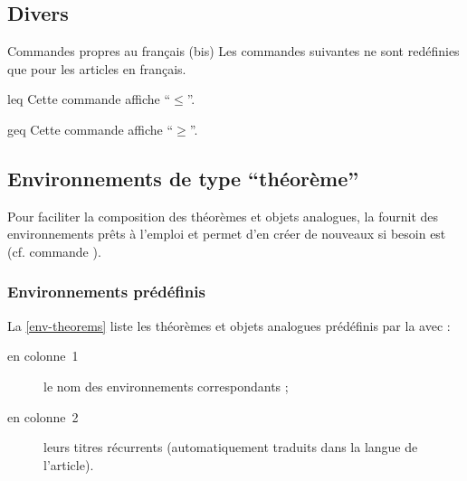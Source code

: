 \documentclass[english,nolocaltoc]{nwejmart}
\newtheorem[style=definition]{fait}
\newtheorem[title=expérience]{experience}
\newtheorem[title-plural=anneaux]{anneau}
\newtheorem[title=idéal,title-plural=idéaux]{ideal}
\begin{document}
\subsection{Divers}

\begin{dbremark}{Commandes propres au français (bis)}{}
  Les commandes suivantes ne sont redéfinies que pour les articles en
  français.
\end{dbremark}

\begin{docCommand}{leq}{}
  Cette commande affiche \enquote{$\leq$}.
\end{docCommand}
\begin{docCommand}{geq}{}
  Cette commande affiche \enquote{$\geq$}.
\end{docCommand}

\subsection{Environnements de type \enquote{théorème}}

Pour faciliter la composition des théorèmes et objets analogues, la
\nwejmauthorcl{} fournit des environnements prêts à l'emploi et permet d'en
créer de nouveaux si besoin est (cf. commande ).

\subsubsection{Environnements prédéfinis}
\label{sec:envir-de-type}

La \vref{env-theorems} liste les théorèmes et objets analogues prédéfinis par la
\nwejmauthorcl{} avec :
\begin{description}
\item[en colonne~1] le nom des environnements correspondants ;
\item[en colonne~2] leurs titres récurrents (automatiquement traduits dans la
  langue de l'article).
\end{description}
\end{document}
